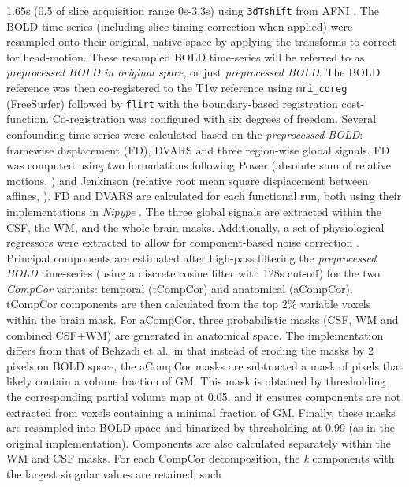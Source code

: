 \documentclass[
]{article}
\begin{document}
\begin{description}
1.65s (0.5 of slice acquisition range 0s-3.3s) using \texttt{3dTshift}
from AFNI \citep[RRID:SCR\_005927]{afni}. The BOLD time-series
(including slice-timing correction when applied) were resampled onto
their original, native space by applying the transforms to correct for
head-motion. These resampled BOLD time-series will be referred to as
\emph{preprocessed BOLD in original space}, or just \emph{preprocessed
BOLD}. The BOLD reference was then co-registered to the T1w reference
using \texttt{mri\_coreg} (FreeSurfer) followed by \texttt{flirt}
\citep[FSL 6.0.5.1:57b01774,][]{flirt} with the boundary-based
registration \citep{bbr} cost-function. Co-registration was configured
with six degrees of freedom. Several confounding time-series were
calculated based on the \emph{preprocessed BOLD}: framewise displacement
(FD), DVARS and three region-wise global signals. FD was computed using
two formulations following Power (absolute sum of relative motions,
\citet{power_fd_dvars}) and Jenkinson (relative root mean square
displacement between affines, \citet{mcflirt}). FD and DVARS are
calculated for each functional run, both using their implementations in
\emph{Nipype} \citep[following the definitions by][]{power_fd_dvars}.
The three global signals are extracted within the CSF, the WM, and the
whole-brain masks. Additionally, a set of physiological regressors were
extracted to allow for component-based noise correction
\citep[\emph{CompCor},][]{compcor}. Principal components are estimated
after high-pass filtering the \emph{preprocessed BOLD} time-series
(using a discrete cosine filter with 128s cut-off) for the two
\emph{CompCor} variants: temporal (tCompCor) and anatomical (aCompCor).
tCompCor components are then calculated from the top 2\% variable voxels
within the brain mask. For aCompCor, three probabilistic masks (CSF, WM
and combined CSF+WM) are generated in anatomical space. The
implementation differs from that of Behzadi et al.~in that instead of
eroding the masks by 2 pixels on BOLD space, the aCompCor masks are
subtracted a mask of pixels that likely contain a volume fraction of GM.
This mask is obtained by thresholding the corresponding partial volume
map at 0.05, and it ensures components are not extracted from voxels
containing a minimal fraction of GM. Finally, these masks are resampled
into BOLD space and binarized by thresholding at 0.99 (as in the
original implementation). Components are also calculated separately
within the WM and CSF masks. For each CompCor decomposition, the
\emph{k} components with the largest singular values are retained, such

\end{description}
\end{document}
